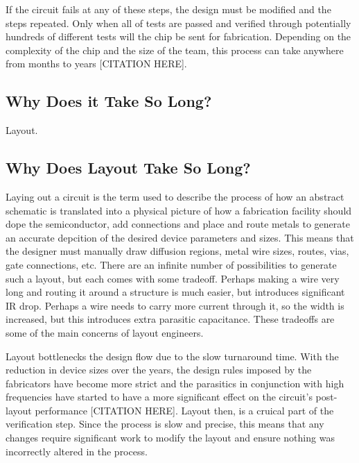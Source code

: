 
If the circuit fails at any of these steps, the design must be modified and the steps repeated. Only when all of tests are passed and verified through potentially hundreds of different tests will the chip be sent for fabrication. Depending on the complexity of the chip and the size of the team, this process can take anywhere from months to years [CITATION HERE].
\subsection{Why Does it Take So Long?}
Layout.

\subsection{Why Does Layout Take So Long?}
Laying out a circuit is the term used to describe the process of how an abstract schematic is translated into a physical picture of how a fabrication facility should dope the semiconductor, add connections and place and route metals to generate an accurate depcition of the desired device parameters and sizes. This means that the designer must manually draw diffusion regions, metal wire sizes, routes, vias, gate connections, etc. There are an infinite number of possibilities to generate such a layout, but each comes with some tradeoff. Perhaps making a wire very long and routing it around a structure is much easier, but introduces significant IR drop. Perhaps a wire needs to carry more current through it, so the width is increased, but this introduces extra parasitic capacitance. These tradeoffs are some of the main concerns of layout engineers. 

Layout bottlenecks the design flow due to the slow turnaround time. With the reduction in device sizes over the years, the design rules imposed by the fabricators have become more strict and the parasitics in conjunction with high frequencies have started to have a more significant effect on the circuit's post-layout performance  [CITATION HERE]. Layout then, is a cruical part of the verification step. Since the process is slow and precise, this means that any changes require significant work to modify the layout and ensure nothing was incorrectly altered in the process.

